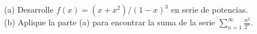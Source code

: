 \item (a) Desarrolle $f(x) = (x+x^2)/(1-x)^3$ en serie de potencias. \\
    (b) Aplique la parte (a) para encontrar la suma de la serie $\sum_{n=1}^\infty \frac{n^2}{2^n}$.
